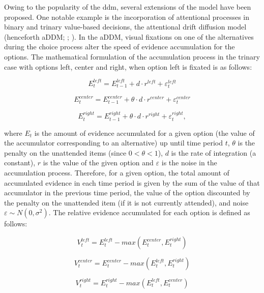 \documentclass[11pt,a4paper]{article}
\begin{document}
Owing to the popularity of the ddm, several extensions of the model have been proposed. One notable example is the incorporation of attentional processes in binary and trinary value-based decisions, the attentional drift diffusion model (henceforth aDDM;  ; ). In the aDDM, visual fixations on one of the alternatives during the choice process alter the speed of evidence accumulation for the options. The mathematical formulation of the accumulation process in the trinary case with options left, center and right, when option left is fixated is as follows:

\begin{equation}
E_{t}^{left}=E_{t-1}^{left}+d\cdot r^{left}+\varepsilon_{t}^{left}
\end{equation}

\begin{equation}
E_{t}^{center}=E_{t-1}^{center}+\theta\cdot d\cdot r^{center}+\varepsilon_{t}^{center}
\end{equation}


\begin{equation}
E_{t}^{right}=E_{t-1}^{right}+\theta\cdot d\cdot r^{right}+\varepsilon_{t}^{right},
\end{equation}

where $E_{t}$ is the amount of evidence accumulated for a given option
(the value of the accumulator corresponding to an alternative) up
until time period $t$, $\theta$ is the penalty on the unattended
items (since $0<\theta<1$), $d$ is the rate of integration (a constant),
$r$ is the value of the given option and $\varepsilon$ is the noise
in the accumulation process. Therefore, for a given option, the total
amount of accumulated evidence in each time period is given by the
sum of the value of that accumulator in the previous time period,
the value of the option discounted by the penalty on the unattended
item (if it is not currently attended), and noise $\varepsilon\sim N(0,\sigma^{2})$.
The relative evidence accumulated for each option is defined as follows:

\begin{equation}
V_{t}^{left}=E_{t}^{left}-max(E_{t}^{center},E_{t}^{right})
\end{equation}

\begin{equation}
V_{t}^{center}=E_{t}^{center}-max(E_{t}^{left},E_{t}^{right})
\end{equation}


\begin{equation}
V_{t}^{right}=E_{t}^{right}-max(E_{t}^{left},E_{t}^{center})
\end{equation}
\end{document}
